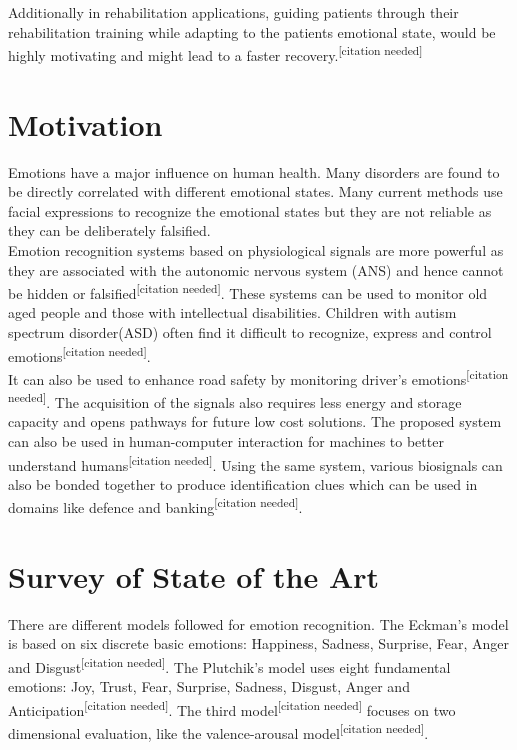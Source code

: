 \documentclass[11pt]{article}
\theoremstyle{definition}
\begin{document}
    Additionally in rehabilitation applications, guiding patients through their rehabilitation training while adapting to the patients emotional state, would be highly motivating and might lead to a faster recovery.\textsuperscript{[citation needed]}

  \section{Motivation}
    Emotions have a major influence on human health. 
    Many disorders are found to be directly correlated with different emotional states.
    Many current methods use facial expressions to recognize the emotional states but they are not reliable as they can be deliberately falsified. \\Emotion recognition systems based on physiological signals are more powerful as they are associated with the autonomic nervous system (ANS) and hence cannot be hidden or falsified\textsuperscript{[citation needed]}. These systems can be used to monitor old aged people and those with intellectual disabilities. Children with autism spectrum disorder(ASD) often find it difficult to recognize, express and control emotions\textsuperscript{[citation needed]}. \\
    It can also be used to enhance road safety by monitoring driver's emotions\textsuperscript{[citation needed]}. 
    The acquisition of the signals also requires less energy and storage capacity and opens pathways for future low cost solutions. The proposed system can also be used in human-computer interaction for machines to better understand humans\textsuperscript{[citation needed]}. Using the same system, various biosignals can also be bonded together to produce identification clues which can be used in domains like defence and banking\textsuperscript{[citation needed]}.


  \section{Survey of State of the Art}
    There are different models followed for emotion recognition. The Eckman's model is based on six discrete basic emotions: Happiness, Sadness, Surprise, Fear, Anger and Disgust\textsuperscript{[citation needed]}. The Plutchik's model uses eight fundamental emotions: Joy, Trust, Fear, Surprise, Sadness, Disgust, Anger and Anticipation\textsuperscript{[citation needed]}. The third model\textsuperscript{[citation needed]} focuses on two dimensional evaluation, like the valence-arousal model\textsuperscript{[citation needed]}.
\end{document}
